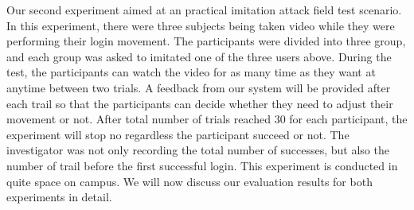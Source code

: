 Our second experiment aimed at an practical imitation attack field test scenario. In this experiment, there were three subjects being taken video while they were performing their login movement. The participants were divided into three group, and each group was asked to imitated one of the three users above. During the test, the participants can watch the video for as many time as they want at anytime between two trials. A feedback from our system will be provided after each trail so that the participants can decide whether they need to adjust their movement or not. After total number of trials reached 30 for each participant, the experiment will stop no regardless the participant succeed or not. The investigator was not only recording the total number of successes, but also the number of trail before the first successful login. This experiment is conducted in quite space on campus. We will now discuss our evaluation results for both experiments in detail. 


